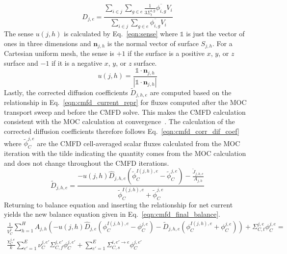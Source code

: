 \begin{equation}
	D_{j,e} = \frac{\sum_{i \in j} \sum_{g \in e} \frac{1}{3\Sigma_{t}^{i, g}} \overline{\phi_{i,g}} V_i}{\sum_{i \in j} \sum_{g \in e} \overline{\phi_{i,g}} V_i}
	\label{eqn:cmfd_diff_coef}
\end{equation}
The sense $u(j,h)$ is calculated by Eq.~\ref{eqn:sense} where $\mathbb{1}$ is just the vector of ones in three dimensions and $\mathbf{n}_{j,h}$ is the normal vector of surface $S_{j,h}$. For a Cartesian uniform mesh, the sense is $+1$ if the surface is a positive $x$, $y$, or $z$ surface and $-1$ if it is a negative $x$, $y$, or $z$ surface.
\begin{equation}
u(j,h) = \frac{\mathbb{1} \cdot \mathbf{n}_{j,h}}{|\mathbb{1} \cdot \mathbf{n}_{j,h}|}
\label{eqn:sense}
\end{equation}
Lastly, the corrected diffusion coefficients $\tilde{D}_{j,h,e}$ are computed based on the relationship in Eq.~\ref{eqn:cmfd_current_repr} for fluxes computed after the \ac{MOC} transport sweep and before the \ac{CMFD} solve. This makes the \ac{CMFD} calculation consistent with the \ac{MOC} calculation at convergence~\cite{smith1983cmfd}. The calculation of the corrected diffusion coefficients therefore follows Eq.~\ref{eqn:cmfd_corr_dif_coef} where $\tilde{\phi}_C^{j,e}$ are the \ac{CMFD} cell-averaged scalar fluxes calculated from the \ac{MOC} iteration with the tilde indicating the quantity comes from the \ac{MOC} calculation and does not change throughout the \ac{CMFD} iterations.
\begin{equation}
	\tilde{D}_{j,h,e} = \frac{-u(j, h) \hat{D}_{j,h,e} \left(\tilde{\phi}_C^{I(j,h),e} - \tilde{\phi}_C^{j,e}\right) - \frac{\tilde{J}_{j,h,e}}{A_{j,h}}}{\tilde{\phi}_C^{I(j,h),e} + \tilde{\phi}_C^{j,e}}
	\label{eqn:cmfd_corr_dif_coef}
\end{equation}
Returning to balance equation and inserting the relationship for net current yields the new balance equation given in Eq.~\ref{eqn:cmfd_final_balance}.
\begin{equation}
\begin{split}
	\frac{1}{V_C^j} \sum_{h=1}^H A_{j,h} \left( - u(j, h) \hat{D}_{j,e} \left(\phi_C^{I(j,h),e} - \phi_C^{j,e}\right) - \tilde{D}_{j,h,e} \left(\phi_C^{I(j,h),e} + \phi_C^{j,e}\right) \right) + \Sigma_{C,t}^{j,e} \phi_C^{j,e} = \\
	\frac{\chi_C^{j,e}}{k} \sum_{e'=1}^{E} \nu_C^{j, e'} \Sigma_{C,f}^{j,e'} \phi_C^{j,e'} + \sum_{e'=1}^E  \Sigma_{C,s}^{i, e' \rightarrow e} \phi_C^{j,e'}
\end{split}
\label{eqn:cmfd_final_balance}
\end{equation}

